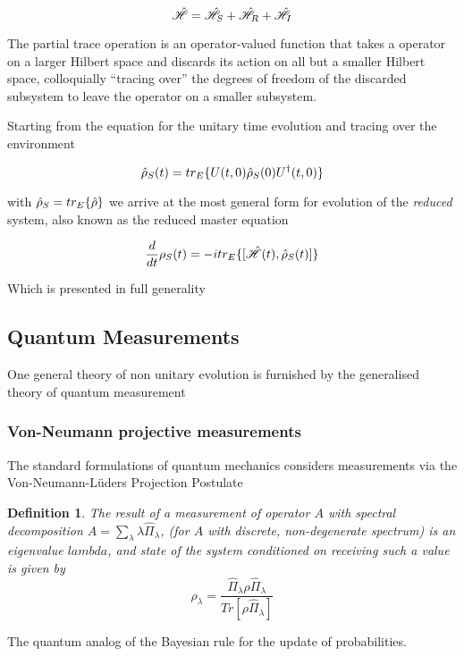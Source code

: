 \begin{equation}
	\hat{\mathscr{H}} = \hat{\mathscr{H}}_S +\hat{\mathscr{H}}_R + \hat{\mathscr{H}}_I
\end{equation}

The partial trace operation is an operator-valued function that takes a operator on a larger Hilbert space and discards its action on all but a smaller Hilbert space, colloquially ``tracing over'' the degrees of freedom of the discarded subsystem to leave the operator on a smaller subsystem.

Starting from the equation for the unitary time evolution and tracing over the environment

\begin{equation}
	\hat{\rho}_S (t) = tr_E \{U(t, 0) \hat{\rho}_S (0) U^\dagger (t, 0) \}
\end{equation}

with $\hat{\rho}_S = tr_E\{\hat{\rho} \}$ we arrive at the most general form for evolution of the \emph{reduced} system, also known as the reduced master equation

\begin{equation}
	\frac{d}{dt} \rho_S (t) = -itr_E\{[\hat{\mathscr{H}}(t), \hat{\rho}_S(t)]\}
\end{equation}

Which is presented in full generality

\subsection{Quantum Measurements}
One general theory of non unitary evolution is furnished by the generalised theory of quantum measurement \cite{Wiseman2010a}

\subsubsection{Von-Neumann projective measurements}
The standard formulations of quantum mechanics considers measurements via the Von-Neumann-L\"uders Projection Postulate\cite{Dirac1927}

\newtheorem{definition}{Definition}
\begin{definition}
    The result of a measurement of operator $A$ with spectral decomposition $A = \sum_\lambda \lambda \hat{\Pi}_\lambda $, (for $A$ with discrete, non-degenerate spectrum) is an eigenvalue $lambda$, and state of the system conditioned on receiving such a value is given by
    \begin{equation}
        \rho_\lambda = \frac{\hat{\Pi}_\lambda \rho \hat{\Pi}_\lambda}{Tr[\rho\hat{\Pi}_\lambda]}
    \end{equation}
\end{definition}
The quantum analog of the Bayesian rule for the update of probabilities.

